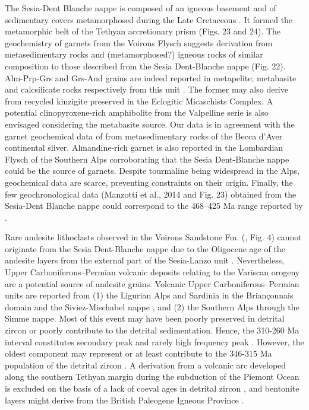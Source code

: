 \documentclass[twoside]{article}
\begin{document}
The Sesia-Dent Blanche nappe is composed of an igneous basement and of sedimentary covers metamorphosed during the Late Cretaceous \citep{Manzotti2014}. It formed the metamorphic belt of the Tethyan accretionary prism (Figs. 23 and 24). The geochemistry of garnets from the Voirons Flysch suggests derivation from metasedimentary rocks and (metamorphosed?) igneous rocks of similar composition to those described from the Sesia Dent-Blanche nappe (Fig. 22). Alm-Prp-Grs and Grs-And grains are indeed reported in metapelite; metabasite and calcsilicate rocks respectively from this unit \citep{DalPiaz1983}. The former may also derive from recycled kinzigite preserved in the Eclogitic Micaschists Complex. A potential clinopyroxene-rich amphibolite from the Valpelline serie is also envisaged considering the metabasite source. Our data is in agreement with the garnet geochemical data of \cite{Kirst2014} from metasedimentary rocks of the Becca d’Aver continental sliver. Almandine-rich garnet is also reported in the Lombardian Flysch of the Southern Alps \citep{Bernoulli1990} corroborating that the Sesia Dent-Blanche nappe could be the source of garnets. Despite tourmaline being widespread in the Alps, geochemical data are scarce, preventing constraints on their origin. Finally, the few geochronological data (Manzotti et al., 2014 and Fig. 23) obtained from the Sesia-Dent Blanche nappe could correspond to the 468–425 Ma range reported by \cite{Butler2011}.\par
Rare andesite lithoclasts observed in the Voirons Sandstone Fm. (\citealp{Ospina-Ostios2013}, Fig. 4) cannot originate from the Sesia Dent-Blanche nappe due to the Oligocene age of the andesite layers from the external part of the Sesia-Lanzo unit \citep[and references therein]{Venturelli1984}. Nevertheless, Upper Carboniferous–Permian volcanic deposits relating to the Variscan orogeny \citep{Cortesogno1998a} are a potential source of andesite grains. Volcanic Upper Carboniferous–Permian units are reported from (1) the Ligurian Alps and Sardinia in the Briançonnais domain \citep{Cortesogno1998a,Decarlis2013} and the Siviez-Mischabel nappe \citep{Sartori2006}, and (2) the Southern Alps \citep{Cortesogno1998a} through the Simme nappe. Most of this event may have been poorly preserved in detrital zircon or poorly contribute to the detrital sedimentation. Hence, the 310-260 Ma interval constitutes secondary peak and rarely high frequency peak \citep[see sample 11EB07 in 280-300 Ma range for the latter]{Butler2011}. However, the oldest component may represent or at least contribute to the 346-315 Ma population of the detrital zircon \citep[Fig. 23]{Butler2011}. A derivation from a volcanic arc developed along the southern Tethyan margin during the subduction of the Piemont Ocean \citep{Gasinski1997} is excluded on the basis of a lack of coeval ages in detrital zircon \citep{Butler2011,Beltran-Trivino2013}, and bentonite layers \citep{Winkler1985a,Winkler1990} might derive from the British Paleogene Igneous Province \citep{Koch2015}.\par
\end{document}
